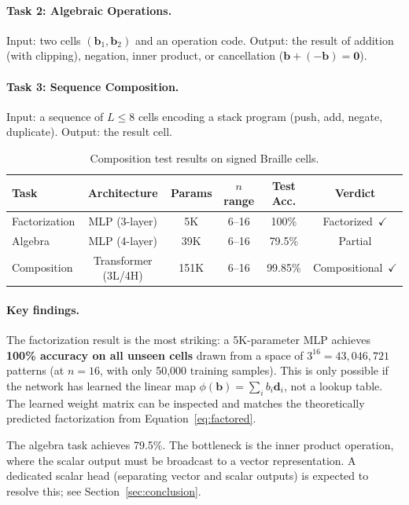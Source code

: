 \documentclass[11pt,a4paper]{article}
\newcommand{\bvec}{\bm{b}}
\newcommand{\dvec}{\bm{d}}
\begin{document}
\paragraph{Task 2: Algebraic Operations.}
Input: two cells $(\bvec_1, \bvec_2)$ and an operation code.
Output: the result of addition (with clipping), negation, inner product,
or cancellation ($\bvec + (-\bvec) = \bm{0}$).

\paragraph{Task 3: Sequence Composition.}
Input: a sequence of $L \leq 8$ cells encoding a stack program
(push, add, negate, duplicate).
Output: the result cell.

\begin{table}[h]
  \centering
  \begin{tabular}{@{}lccccc@{}}
    \toprule
    Task & Architecture & Params & $n$ range & Test Acc. & Verdict \\
    \midrule
    Factorization & MLP (3-layer) & 5K & 6--16 & 100\% & Factorized~$\checkmark$ \\
    Algebra       & MLP (4-layer) & 39K & 6--16 & 79.5\% & Partial \\
    Composition   & Transformer (3L/4H) & 151K & 6--16 & 99.85\% & Compositional~$\checkmark$ \\
    \bottomrule
  \end{tabular}
  \caption{Composition test results on signed Braille cells.}
  \label{tab:composition}
\end{table}

\paragraph{Key findings.}
The factorization result is the most striking: a 5K-parameter MLP
achieves \textbf{100\% accuracy on all unseen cells} drawn from
a space of $3^{16} = 43{,}046{,}721$ patterns (at $n=16$,
with only 50{,}000 training samples).
This is only possible if the network has learned the
linear map $\phi(\bvec) = \sum_i b_i \dvec_i$, not a lookup table.
The learned weight matrix can be inspected and matches the
theoretically predicted factorization from
Equation~\ref{eq:factored}.

The algebra task achieves 79.5\%.
The bottleneck is the inner product operation, where the scalar output
must be broadcast to a vector representation.
A dedicated scalar head (separating vector and scalar outputs) is
expected to resolve this; see Section~\ref{sec:conclusion}.
\end{document}
